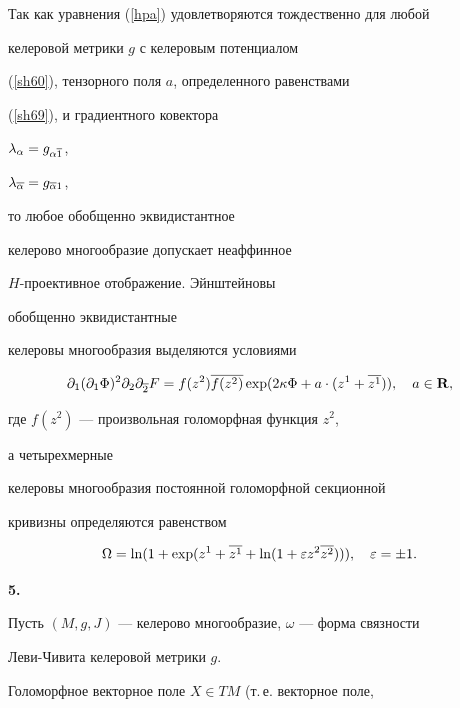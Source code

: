 \begin{notenonum}


Так как уравнения (\ref{hpa}) удовлетворяются тождественно для любой


келеровой метрики $g$ с келеровым потенциалом


(\ref{sh60}), тензорного поля $a$, определенного равенствами


(\ref{sh69}), и градиентного ковектора


$\lambda_\alpha = g_{\alpha \overline1}$,


$\lambda_{\overline\alpha} = g_{\overline\alpha 1}$,


то любое обобщенно эквидистантное


келерово многообразие допускает неаффинное


$H$-проективное отображение. Эйнштейновы


обобщенно эквидистантные


келеровы многообразия выделяются условиями


$$


\pl 1 (\pl 1 \Phi)^2 \pl 2\pl {\ol 2} F =


f(z^2) \ol{f(z^2)}\exp (2\kappa \Phi +


a\cdot (z^1 +\ol {z^1})), \quad a\in {\bold R},


$$


где $f(z^2)$ --- произвольная голоморфная функция $z^2$,


а четырехмерные


келеровы многообразия постоянной голоморфной секционной


кривизны определяются равенством


$$


\Omega = \ln (1 + \exp (z^1+\ol{z^1}+


\ln (1+ \varepsilon z^2 \ol{z^2}))),


\quad


\varepsilon = \pm 1.


$$


\end{notenonum}





{\bf 5.}


Пусть $(M,g,J)$ --- келерово многообразие, $\omega$ --- форма связности


Леви-Чивита келеровой метрики $g$.


Голоморфное векторное поле $X \in TM$ (т.\,е. векторное поле,


